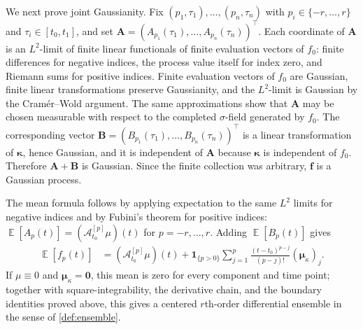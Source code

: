 \documentclass[11pt,a4paper]{article}
\theoremstyle{definition}
\theoremstyle{remark}
\DeclareMathOperator{\E}{\mathbb{E}}
\begin{document}
\begin{mainproof}
We next prove joint Gaussianity. Fix \((p_1,\tau_1),\ldots,(p_n,\tau_n)\) with \(p_i\in\{-r,\ldots,r\}\) and \(\tau_i\in[t_0,t_1]\), and set \(\mathbf A=(A_{p_1}(\tau_1),\ldots,A_{p_n}(\tau_n))^\top\). Each coordinate of \(\mathbf A\) is an \(L^2\)-limit of finite linear functionals of finite evaluation vectors of \(f_0\): finite differences for negative indices, the process value itself for index zero, and Riemann sums for positive indices. Finite evaluation vectors of \(f_0\) are Gaussian, finite linear transformations preserve Gaussianity, and the \(L^2\)-limit is Gaussian by the Cram\'er--Wold argument. The same approximations show that \(\mathbf A\) may be chosen measurable with respect to the completed \(\sigma\)-field generated by \(f_0\). The corresponding vector \(\mathbf B=(B_{p_1}(\tau_1),\ldots,B_{p_n}(\tau_n))^\top\) is a linear transformation of \(\boldsymbol\kappa\), hence Gaussian, and it is independent of \(\mathbf A\) because \(\boldsymbol\kappa\) is independent of \(f_0\). Therefore \(\mathbf A+\mathbf B\) is Gaussian. Since the finite collection was arbitrary, \(\mathbf f\) is a Gaussian process.

The mean formula follows by applying expectation to the same \(L^2\) limits for negative indices and by Fubini's theorem for positive indices: $\E[A_p(t)] = (\mathcal A_{t_0}^{[p]}\mu)(t)$ for $p=-r,\ldots,r$. Adding \(\E[B_p(t)]\) gives
\begin{align*}
\E[f_p(t)]
&=
(\mathcal A_{t_0}^{[p]}\mu)(t)
+
\mathbf{1}_{\{p>0\}}
\sum_{j=1}^{p}\frac{(t-t_0)^{p-j}}{(p-j)!}(\boldsymbol\mu_\kappa)_j.
\end{align*}
If \(\mu\equiv0\) and \(\boldsymbol\mu_\kappa=\mathbf0\), this mean is zero for every component and time point; together with square-integrability, the derivative chain, and the boundary identities proved above, this gives a centered \(r\)th-order differential ensemble in the sense of \cref{def:ensemble}.


\end{mainproof}
\end{document}
